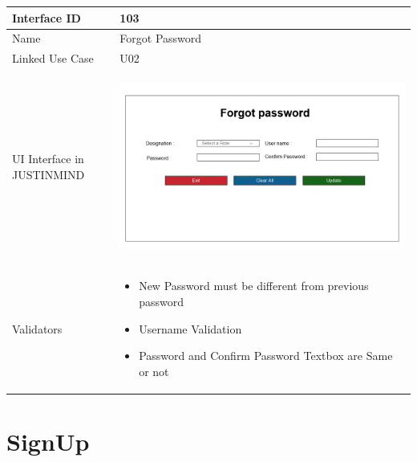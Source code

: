 \documentclass[12pt,a4paper]{report}
\begin{document}
\begin{tabular}{ | m{3cm} | m{12cm}| } \hline

Interface ID &  103 \\\hline

Name  	      & Forgot Password  \\ \hline

Linked Use Case & U02 \\ \hline

UI Interface in JUSTINMIND & \begin{center} \includegraphics[scale=0.3]{./User Interface/UI-003 Forgot password@1x.png}\end{center}  \\ \hline

Validators & 
\begin{itemize}
\item  New Password must be different from previous password
\item  Username Validation
\item  Password and Confirm Password Textbox are Same or not
\end{itemize}
\\ \hline

\end{tabular} 
\section{SignUp}
\end{document}
